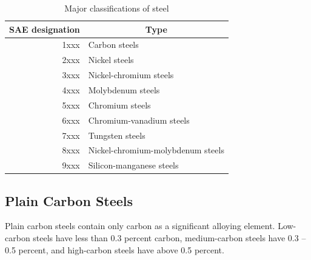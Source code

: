 \documentclass[
10pt,
a4paper,
openany,
svgnames,
]{book}
\begin{document}
\begin{table}[h]
  \centering
  \begin{tabular}{rl}
    \toprule
    SAE designation & \multicolumn{1}{c}{Type} \\
    \midrule
    1xxx & Carbon steels \\
    2xxx & Nickel steels \\
    3xxx & Nickel-chromium steels \\
    4xxx & Molybdenum steels \\
    5xxx & Chromium steels \\
    6xxx & Chromium-vanadium steels \\
    7xxx & Tungsten steels \\
    8xxx & Nickel-chromium-molybdenum steels \\
    9xxx & Silicon-manganese steels \\ 
    \bottomrule
  \end{tabular}
  \caption{Major classifications of steel \cite{jeffus2011welding}}
  \label{tab: major class of steel}
\end{table}

\subsection{Plain Carbon Steels}

Plain carbon steels contain only carbon as a significant alloying element. Low-carbon steels have less than 0.3 percent carbon, medium-carbon steels have 0.3 – 0.5 percent, and high-carbon steels have above 0.5 percent.
\end{document}
